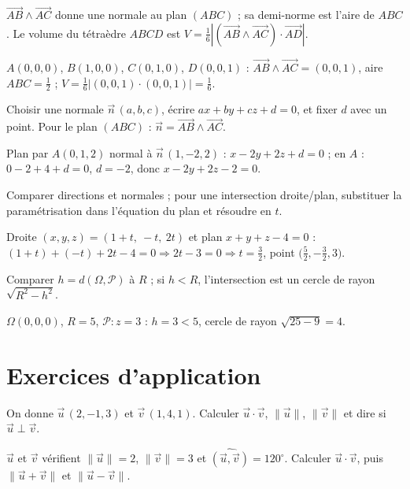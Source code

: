 $\overrightarrow{AB}\wedge\overrightarrow{AC}$ donne une normale au plan $(ABC)$ ; sa
demi-norme est l'aire de $ABC$. Le volume du tétraèdre $ABCD$ est
$V=\tfrac16|(\overrightarrow{AB}\wedge\overrightarrow{AC})\cdot\overrightarrow{AD}|$.
\begin{exemple}
$A(0,0,0)$, $B(1,0,0)$, $C(0,1,0)$, $D(0,0,1)$ :
$\overrightarrow{AB}\wedge\overrightarrow{AC}=(0,0,1)$, aire $ABC=\tfrac12$ ;
$V=\tfrac16|(0,0,1)\cdot(0,0,1)|=\tfrac16$.
\end{exemple}

Choisir une normale $\vec n\,(a,b,c)$, écrire $ax+by+cz+d=0$, et fixer $d$ avec un point.
Pour le plan $(ABC)$ : $\vec n=\overrightarrow{AB}\wedge\overrightarrow{AC}$.
\begin{exemple}
Plan par $A(0,1,2)$ normal à $\vec n\,(1,-2,2)$ : $x-2y+2z+d=0$ ; en $A$ :
$0-2+4+d=0$, $d=-2$, donc $x-2y+2z-2=0$.
\end{exemple}

Comparer directions et normales ; pour une intersection droite/plan, substituer la
paramétrisation dans l'équation du plan et résoudre en $t$.
\begin{exemple}
Droite $(x,y,z)=(1+t,\ -t,\ 2t)$ et plan $x+y+z-4=0$ :
$(1+t)+(-t)+2t-4=0\Rightarrow 2t-3=0\Rightarrow t=\tfrac32$, point $\big(\tfrac52,-\tfrac32,3\big)$.
\end{exemple}

Comparer $h=d(\Omega,\mathcal P)$ à $R$ ; si $h<R$, l'intersection est un cercle de rayon
$\sqrt{R^{2}-h^{2}}$.
\begin{exemple}
$\Omega(0,0,0)$, $R=5$, $\mathcal P:z=3$ : $h=3<5$, cercle de rayon $\sqrt{25-9}=4$.
\end{exemple}

\section{Exercices d'application}

\exo{} On donne $\vec u\,(2,-1,3)$ et $\vec v\,(1,4,1)$. Calculer $\vec u\cdot\vec v$, $\|\vec u\|$, $\|\vec v\|$ et dire si $\vec u\perp\vec v$.

\exo{} $\vec u$ et $\vec v$ vérifient $\|\vec u\|=2$, $\|\vec v\|=3$ et $\widehat{(\vec u,\vec v)}=120^\circ$. Calculer $\vec u\cdot\vec v$, puis $\|\vec u+\vec v\|$ et $\|\vec u-\vec v\|$.

